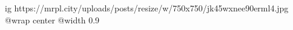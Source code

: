  
 
 
 
 

\ifcmt
  ig https://mrpl.city/uploads/posts/resize/w/750x750/jk45wxnee90erml4.jpg
  @wrap center
  @width 0.9
\fi
